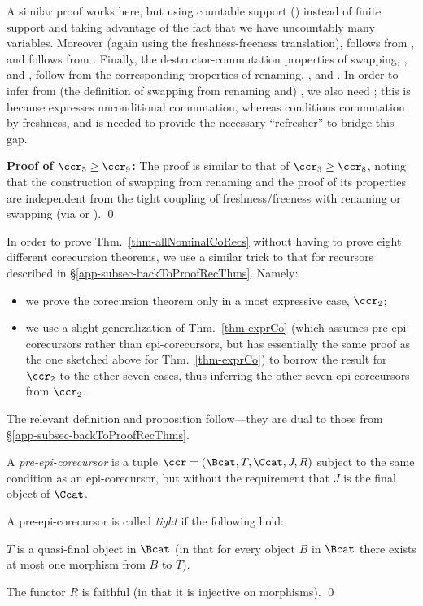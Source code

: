 A similar proof works here, but using countable support (\IFSupFr{}) instead of finite support and taking advantage of the fact that we have uncountably many variables. Moreover (again using the freshness-freeness translation), \IFvDSw{} follows from \IFrDSw{}, and \ISwBvr{} follows from \IRnBvr{}.  
Finally, the destructor-commutation properties of swapping, \ISwVr{}, \ISwAp{} and \ISwLm{}, follow from the corresponding properties of renaming, \IRnVr{}, \IRnAp{} and \IRnLmO{}. 
In order to infer \ISwLm{} from (the definition of swapping from renaming and) \IRnLmO{}, we also need \IIRnBvr{}; this is because  \ISwLm{} expresses unconditional commutation, whereas \IRnLmO{} conditions commutation by freshness, and \IIRnBvr{} is needed to provide the necessary ``refresher'' to bridge this gap. 

\textbf{Proof of $\ccr_{5} \geq \ccr_{9}$:}  
The proof is similar to that of $\ccr_{3} \geq \ccr_{8}$, noting that the construction of swapping from renaming and the proof of its properties are independent from the tight coupling of freshness/freeness with renaming or swapping (via \FvDSw{} or \FrDRn{}). 
%
\qed

\medskip
In order to prove Thm.~\ref{thm-allNominalCoRecs} without having to prove eight different corecursion theorems, we use a similar trick to that for recursors described 
in \S\ref{app-subsec-backToProofRecThms}. Namely:
\begin{itemize}
	\item we prove the corecursion theorem only in 
	a most expressive case, $\ccr_2$; 
	\item we use a slight generalization of Thm.~\ref{thm-exprCo} (which assumes pre-epi-corecursors rather than epi-corecursors, but has essentially the same proof as the one sketched above for Thm.~\ref{thm-exprCo}) to borrow the result for $\ccr_2$ to the other seven cases, thus inferring the other seven epi-corecursors from $\ccr_2$. 
\end{itemize} 

The relevant definition and proposition follow---they are dual to those from \S\ref{app-subsec-backToProofRecThms}. 

\begin{defi}\rm 
	A \emph{pre-epi-corecursor} is a tuple $\ccr = (\Bcat,T,\Ccat,J,R)$ subject to the same condition as an epi-corecursor, but without the requirement that $J$ is the final object of $\Ccat$. 
	
	A pre-epi-corecursor is called \emph{tight}  
	if the following hold:
	\begin{myitem} 
		\item $T$ is a quasi-final object in $\Bcat$ (in that for every object $B$ in $\Bcat$ there exists at most one morphism from $B$ to $T$). 
		\item The functor $R$ is faithful (in that it is injective on morphisms).   	\qed 
	\end{myitem} 
\end{defi}
\medskip

